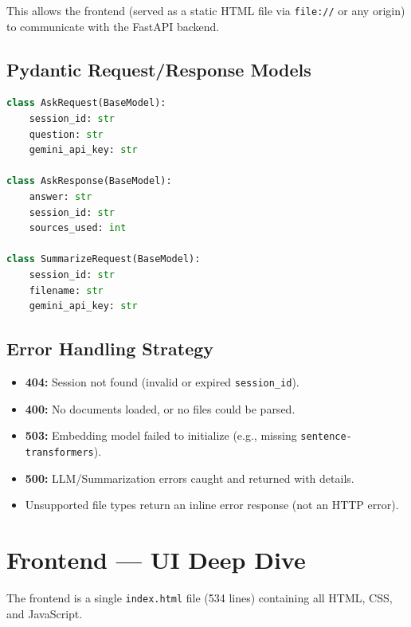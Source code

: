 \documentclass[12pt,a4paper]{article}
\begin{document}
This allows the frontend (served as a static HTML file via \texttt{file://} or any origin) to communicate with the FastAPI backend.

\subsection{Pydantic Request/Response Models}

\begin{lstlisting}[language=Python, caption={API models}]
class AskRequest(BaseModel):
    session_id: str
    question: str
    gemini_api_key: str

class AskResponse(BaseModel):
    answer: str
    session_id: str
    sources_used: int

class SummarizeRequest(BaseModel):
    session_id: str
    filename: str
    gemini_api_key: str
\end{lstlisting}

\subsection{Error Handling Strategy}

\begin{itemize}
  \item \textbf{404:} Session not found (invalid or expired \texttt{session\_id}).
  \item \textbf{400:} No documents loaded, or no files could be parsed.
  \item \textbf{503:} Embedding model failed to initialize (e.g., missing \texttt{sentence-transformers}).
  \item \textbf{500:} LLM/Summarization errors caught and returned with details.
  \item Unsupported file types return an inline error response (not an HTTP error).
\end{itemize}

\section{Frontend — UI Deep Dive}

The frontend is a single \texttt{index.html} file (534 lines) containing all HTML, CSS, and JavaScript.
\end{document}
